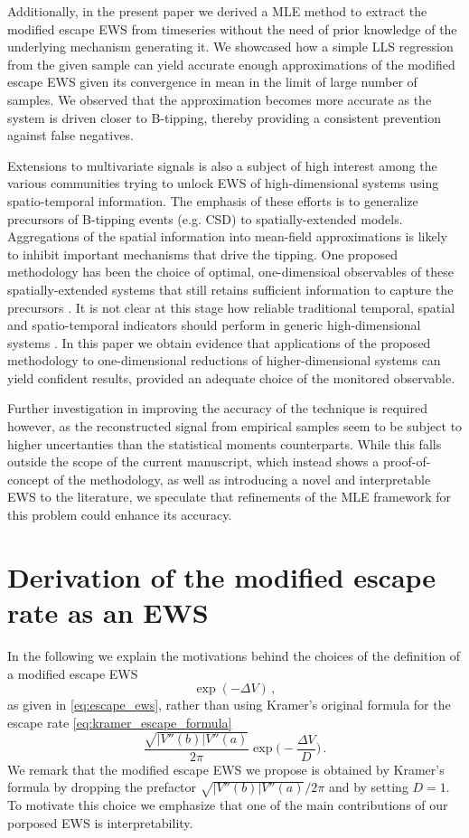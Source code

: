 \documentclass[10pt]{article}
\begin{document}
Additionally, in the present paper we derived a MLE method to extract the modified escape EWS from timeseries without the need of prior knowledge of the underlying mechanism generating it.
We showcased how a simple LLS regression from the given sample can yield accurate enough approximations of the modified escape EWS given its convergence in mean in the limit of large number of samples.
We observed that the approximation becomes more accurate as the system is driven closer to B-tipping, thereby providing a consistent prevention against false negatives.

Extensions to multivariate signals is also a subject of high interest among the various communities trying to unlock EWS of high-dimensional systems using spatio-temporal information.
The emphasis of these efforts is to generalize precursors of B-tipping events (e.g. CSD) to spatially-extended models.
        Aggregations of the spatial information into mean-field approximations is likely to inhibit important mechanisms that drive the tipping.
        One proposed methodology has been the choice of optimal, one-dimensioal observables of these spatially-extended systems that still retains sufficient information to capture the precursors \cite{Lohmann2025b}.
        It is not clear at this stage how reliable traditional temporal, spatial and spatio-temporal indicators should perform in generic high-dimensional systems \cite{Robinson2025}.
In this paper we obtain evidence that applications of the proposed methodology to one-dimensional reductions of higher-dimensional systems can yield confident results, provided an adequate choice of the monitored observable.

Further investigation in improving the accuracy of the technique is required however, as the reconstructed signal from empirical samples seem to be subject to higher uncertanties than the statistical moments counterparts.
While this falls outside the scope of the current manuscript, which instead shows a proof-of-concept of the methodology, as well as introducing a novel and interpretable EWS to the literature, we speculate that refinements of the MLE framework for this problem could enhance its accuracy.
%
\appendix
%
\section{Derivation of the modified escape rate as an EWS}\label{appendix_a}
In the following we explain the motivations behind the choices of the definition of a modified escape EWS
%
\begin{equation*}
        \exp(-\Delta V)\,,
\end{equation*}
%
as given in \eqref{eq:escape_ews}, rather than using Kramer's original formula for the escape rate \eqref{eq:kramer_escape_formula}
%
\begin{equation*}
        \frac{\sqrt{|V''(b)|V''(a)}}{2\pi}\exp\bigg(-\frac{\Delta V}{D}\bigg)\,.
\end{equation*}
%
We remark that the modified escape EWS we propose is obtained by Kramer's formula by dropping the prefactor $\sqrt{|V''(b)|V''(a)}/2\pi$ and by setting $D=1$.
To motivate this choice we emphasize that one of the main contributions of our porposed EWS is interpretability.
\end{document}

